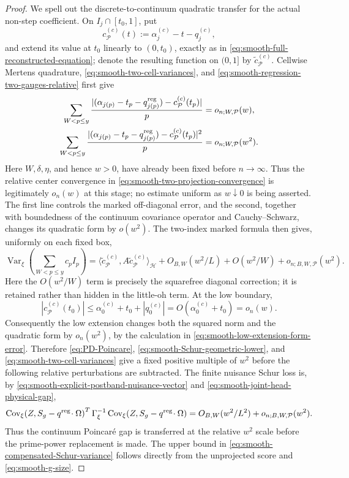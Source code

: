 \documentclass[11pt]{article}
\numberwithin{equation}{section}
\theoremstyle{definition}
\theoremstyle{remark}
\newcommand{\1}{\mathbf 1}
\begin{document}
\begin{proof}
We spell out the discrete-to-continuum quadratic transfer for the actual
non-step coefficient.  On \(I_j\cap[t_0,1]\), put
\[
 c_{\mathcal P}^{(c)}(t):=\alpha_j^{(c)}-t-q_j^{(c)},
\]
and extend its value at \(t_0\) linearly to \((0,t_0)\), exactly as in
\eqref{eq:smooth-full-reconstructed-equation}; denote the resulting
function on \((0,1]\) by
\(\widetilde c_{\mathcal P}^{(c)}\).  Cellwise Mertens
quadrature, \eqref{eq:smooth-two-cell-variances}, and
\eqref{eq:smooth-regression-two-gauges-relative} first give
\begin{equation}
 \begin{aligned}
 \sum_{W<p\le y}\frac{
   |(\alpha_{j(p)}-t_p-q_{j(p)}^{\rm reg})
       -c_{\mathcal P}^{(c)}(t_p)|}{p}
       &=o_{n;W,\mathcal P}(w),\\
 \sum_{W<p\le y}\frac{
   |(\alpha_{j(p)}-t_p-q_{j(p)}^{\rm reg})
       -c_{\mathcal P}^{(c)}(t_p)|^2}{p}
       &=o_{n;W,\mathcal P}(w^2).
 \end{aligned}
 \label{eq:smooth-actual-continuum-coefficient-comparison}
\end{equation}
Here \(W,\delta,\eta\), and hence \(w>0\), have already been fixed
before \(n\to\infty\).  Thus the relative center convergence in
\eqref{eq:smooth-two-projection-convergence} is legitimately
\(o_n(w)\) at this stage; no estimate uniform as \(w\downarrow0\) is
being asserted.  The first line controls the marked off-diagonal error,
and the second, together with boundedness of the continuum covariance
operator and Cauchy--Schwarz, changes its quadratic form by \(o(w^2)\).
The two-index marked formula then gives, uniformly on each fixed box,
\begin{equation}
 \operatorname{Var}_\xi\!\left(\sum_{W<p\le y}c_pI_p\right)
 =\langle \widetilde c_{\mathcal P}^{(c)},
       A\widetilde c_{\mathcal P}^{(c)}\rangle_{\mathcal H}
   +O_{B,W}(w^2/L)+O(w^2/W)
       +o_{n;B,W,\mathcal P}(w^2).
 \label{eq:smooth-nonstep-quadratic-transfer}
\end{equation}
Here the \(O(w^2/W)\) term is precisely the squarefree diagonal
correction; it is retained rather than hidden in the little-oh term.
At the low boundary,
\[
 |c_{\mathcal P}^{(c)}(t_0)|
 \leq \alpha_0^{(c)}+t_0+|q_0^{(c)}|
 =O(\alpha_0^{(c)}+t_0)=o_n(w).
\]
Consequently the low extension changes both the squared norm and the
quadratic form by \(o_n(w^2)\), by the calculation in
\eqref{eq:smooth-low-extension-form-error}.  Therefore
\eqref{eq:PD-Poincare}, \eqref{eq:smooth-Schur-geometric-lower}, and
\eqref{eq:smooth-two-cell-variances} give a fixed positive multiple of
\(w^2\) before the following relative perturbations are subtracted.
The finite nuisance Schur loss is, by
\eqref{eq:smooth-explicit-postband-nuisance-vector} and
\eqref{eq:smooth-joint-head-physical-gap},
\[
 \operatorname{Cov}_\xi\!\left(Z,
       S_g-q^{\rm reg}\!\cdot\Omega\right)^T\Gamma_\xi^{-1}
 \operatorname{Cov}_\xi\!\left(Z,
       S_g-q^{\rm reg}\!\cdot\Omega\right)
 =O_{B,W}(w^2/L^2)+o_{n;B,W,\mathcal P}(w^2).
\]
Thus the continuum Poincar\'e gap is transferred at the relative
\(w^2\) scale before the prime-power replacement is made.  The upper
bound in \eqref{eq:smooth-compensated-Schur-variance} follows directly
from the unprojected score and \eqref{eq:smooth-g-size}.


\end{proof}
\end{document}
